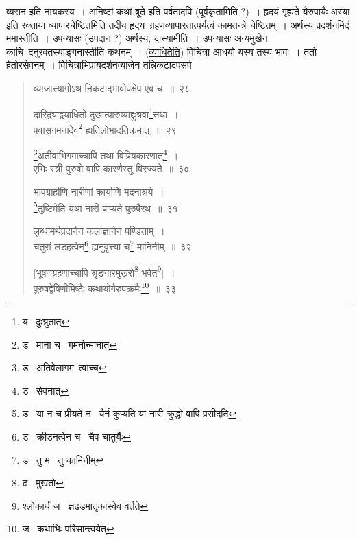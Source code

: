 \documentclass[11pt, openany]{book}
\begin{document}
\vspace{2mm}
\noindent
\underline{व्यसन} इति नायकस्य~। \underline{अनिष्टां कथां ब्रूते} इति पर्वतादपि (पूर्वकृतामिति ?)~। हृदयं गृह्यते यैरुपायैः अस्या इति रक्ताया \underline{व्यापारचेष्टित}मिति तदीय हृदय\textendash\ ग्रहणव्यापारतात्पर्यत्वं कामतन्त्रे चेष्टितम्~। अर्थस्य प्रदर्शनमिदं ममास्तीति~। \underline{उपन्यासः} (उपदानं ?) अर्थस्य, दास्यामीति~। \underline{उपन्यासः} अन्यमुखेन काचि\textendash\ दनुरक्तस्याङ्गनास्तीति कथनम्~। (\underline{व्याधितेति}) विचित्रा आधयो यस्य तस्य भावः~। ततो हेतोरसेवनम्~। विचित्राभिप्रायदर्शनव्याजेन तन्निकटादपसर्प\textendash

\newpage

\begin{quote}
{\na व्याजात्त्यागोऽथ निकटाद्भावोपक्षेप एव च~॥~२८

दारिद्र्याद्वयाधितो दुखात्पारुष्याद्दुःश्रवा\renewcommand{\thefootnote}{1}\footnote{य \textendash\  दुःश्रुतात्}त्तथा~।\\
प्रवासगमनादेव\renewcommand{\thefootnote}{2}\footnote{ड \textendash\  माना च \textendash\  गमनोन्मानात्} ह्यतिलोभादतिक्रमात्~॥~२९

\renewcommand{\thefootnote}{3}\footnote{ड \textendash\  अतिवेलागम\textendash\ त्वाच्च}अतीवाभिगमाच्चापि तथा विप्रियकारणात्\renewcommand{\thefootnote}{4}\footnote{ड \textendash\  सेवनात्}~।\\
एभिः स्त्री पुरुषो वापि कारणैस्तु विरज्यते~॥~३०

भावग्राहीणि नारीणां कार्याणि मदनाश्रये~।\\
\renewcommand{\thefootnote}{5}\footnote{ड \textendash\  या न च प्रीयते न \textendash\  यैर्न कुप्यति या नारी क्रुद्धो वापि प्रसीदति}तुष्टिमेति यथा नारी प्राप्यते पुरुषैरथ~॥~३१

लुब्धामर्थप्रदानेन कलाज्ञानेन पण्डिताम्~।\\
चतुरां लडहत्वेन\renewcommand{\thefootnote}{6}\footnote{ड \textendash\  क्रीडनत्वेन च \textendash\  चैव चातुर्यैः} ह्यनुवृत्त्या च\renewcommand{\thefootnote}{7}\footnote{ड \textendash\  तु म \textendash\  तु कामिनीम्} मानिनीम्~॥~३२

[भूषणग्रहणाच्चापि श्रृङ्गारमुखरो\renewcommand{\thefootnote}{8}\footnote{ढ \textendash\  मुखतो} भवेत्\renewcommand{\thefootnote}{9}\footnote{श्लोकार्धं ज \textendash\  ज्ञढडमातृकास्वेव वर्तते}]~।\\
पुरुषद्वेषिणीमिष्टैः कथायोगैरुपक्रमैः\renewcommand{\thefootnote}{10}\footnote{ज \textendash\  कथाभिः परिसान्त्वयेत्}~॥~३३}
\end{quote}
\end{document}
